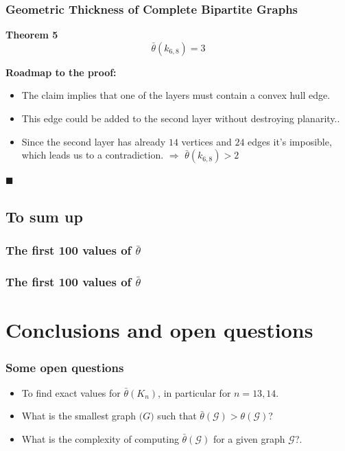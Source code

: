 \documentclass[12 pt]{beamer}
\begin{document}
\begin{frame}{}
    
    \frametitle{Geometric Thickness of Complete Bipartite Graphs}
    
    \begin{block}{\textbf{Theorem 5}}
    $$\bar{\theta} (k_{6,8}) = 3$$
    \end{block}
    
    \textbf{Roadmap to the proof:}
    
    \begin{itemize}
        \item The claim implies that one of the layers must contain a convex hull edge.
        \item This edge could be added to the second layer without destroying planarity..
        \item Since the second layer has already $14$ vertices and $24$ edges it's imposible, which leads us to a contradiction. $\Rightarrow$ $\bar{\theta} (k_{6,8}) > 2$
    \end{itemize}
    \begin{flushright}
    $\blacksquare$
    \end{flushright}
\end{frame}

    \subsection{To sum up}
    
\begin{frame}{}
    \frametitle{The first 100 values of  $\bar{\theta}$}
\end{frame}

\begin{frame}{}
    \frametitle{The first 100 values of  $\bar{\theta}$}
\end{frame}

\section{Conclusions and open questions}

\begin{frame}{}
    \frametitle{Some open questions}
    
    \begin{itemize}
        \item To find exact values for $\bar{\theta}(K_{n})$, in particular for $n = 13, 14$.
        \item What is the smallest graph $\mathcal(G)$ such that $\bar{\theta}(\mathcal{G}) > \theta(\mathcal{G})$?
        \item What is the complexity of computing $\bar{\theta}(\mathcal{G})$ for a given graph $\mathcal{G}$?.
    \end{itemize}
    
\end{frame}
\end{document}
